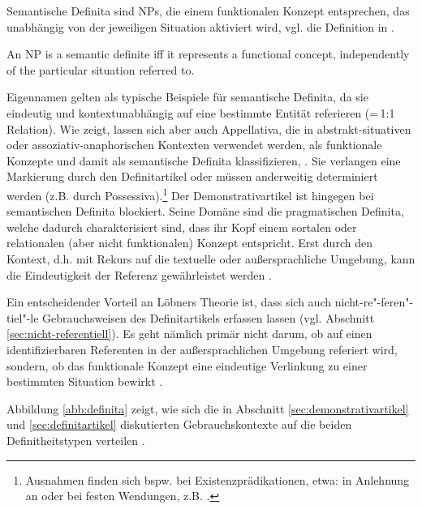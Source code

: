\noindent
Semantische Definita sind NPs, die einem funktionalen Konzept entsprechen, das unabhängig von der jeweiligen Situation aktiviert wird, vgl. die Definition in . 

\begin{exe}
	\ex \label{semdef}  An NP is a semantic definite iff it represents a functional concept, independently of the particular situation referred to. \parencite[299]{Lobner1985}
\end{exe}

Eigennamen gelten als typische Beispiele für semantische Definita, da sie eindeutig und kontextunabhängig auf eine bestimmte Entität referieren (=\,1:1 Relation). Wie \textcite[299--307]{Lobner1985} zeigt, lassen sich aber auch Appellativa, die in abstrakt-situativen oder assoziativ-anaphorischen Kontexten verwendet werden, als funktionale Konzepte und damit als semantische Definita klassifizieren, \parencite[s. hierzu auch ausführlich][104--110]{Demske2001}. Sie verlangen eine Markierung durch den Definitartikel oder müssen anderweitig determiniert werden (z.B. durch Possessiva).\footnote{Ausnahmen finden sich bspw. bei Existenzprädikationen, etwa:  in Anlehnung an \textcite[297]{Lobner1985} oder bei festen Wendungen, z.B.  \parencite[311]{Lobner1985}.}
Der Demonstrativartikel ist hingegen bei semantischen Definita blockiert. Seine Domäne sind die pragmatischen Definita, welche dadurch charakterisiert sind, dass ihr Kopf einem sortalen oder relationalen (aber nicht funktionalen) Konzept entspricht. Erst durch den Kontext, d.h. mit Rekurs auf die textuelle oder außersprachliche Umgebung, kann die Eindeutigkeit der Referenz gewährleistet werden \parencite[307]{Lobner1985}. 

Ein entscheidender Vorteil an Löbners Theorie ist, dass sich auch nicht-re"-feren"-tiel"-le Gebrauchsweisen des Definitartikels erfassen lassen (vgl. Abschnitt \ref{sec:nicht-referentiell}). Es geht nämlich primär nicht darum, ob auf einen  identifizierbaren Referenten in der außersprachlichen Umgebung referiert wird, sondern, ob das funktionale Konzept eine eindeutige Verlinkung zu einer bestimmten Situation bewirkt \parencite[304ff.]{Lobner1985}. 


Abbildung \ref{abb:definita} zeigt, wie sich die in Abschnitt \ref{sec:demonstrativartikel} und \ref{sec:definitartikel} diskutierten Gebrauchskontexte auf die beiden Definitheitstypen verteilen \parencite[angelehnt an und erweitert nach][73]{Szczepaniak2011a}. 

